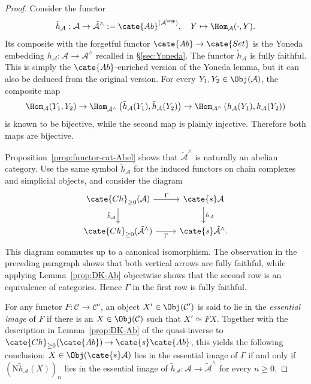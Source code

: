 \begin{proof}
	Consider the functor
	\[ \tilde{h}_{\mathcal{A}}: \mathcal{A} \to \tilde{\mathcal{A}}^\wedge := \cate{Ab}^{(\mathcal{A}^{\opp})}, \quad Y \mapsto \Hom_{\mathcal{A}}(\cdot, Y). \]
	Its composite with the forgetful functor
	$\cate{Ab}\to\cate{Set}$ is the Yoneda embedding
	$h_{\mathcal{A}}:\mathcal{A}\to\mathcal{A}^\wedge$ recalled in
	\S\ref{sec:Yoneda}. The functor $\tilde{h}_{\mathcal{A}}$ is fully
	faithful. This is simply the $\cate{Ab}$-enriched version of the Yoneda
	lemma, but it can also be deduced from the original version. For every
	$Y_1,Y_2\in\Obj(\mathcal{A})$, the composite map
	\[ \Hom_{\mathcal{A}}(Y_1, Y_2) \to \Hom_{\tilde{\mathcal{A}}^\wedge}\left(\tilde{h}_{\mathcal{A}}(Y_1), \tilde{h}_{\mathcal{A}}(Y_2) \right) \to \Hom_{\mathcal{A}^\wedge}\left( h_{\mathcal{A}}(Y_1), h_{\mathcal{A}}(Y_2)\right) \]
	is known to be bijective, while the second map is plainly injective.
	Therefore both maps are bijective.

	Proposition~\ref{prop:functor-cat-Abel} shows that
	$\tilde{\mathcal{A}}^\wedge$ is naturally an abelian category. Use the
	same symbol $\tilde{h}_{\mathcal{A}}$ for the induced functors on chain
	complexes and simplicial objects, and consider the diagram
	\begin{equation*}\begin{tikzcd}
		\cate{Ch}_{\geq 0}(\mathcal{A}) \arrow[d, "{\tilde{h}_{\mathcal{A}}}"'] \arrow[r, "\Gamma"] & \cate{s}\mathcal{A} \arrow[d, "{\tilde{h}_{\mathcal{A}}}"] \\
		\cate{Ch}_{\geq 0}(\tilde{\mathcal{A}}^\wedge) \arrow[r, "\Gamma"'] & \cate{s}\tilde{\mathcal{A}}^\wedge.
	\end{tikzcd}\end{equation*}
	This diagram commutes up to a canonical isomorphism. The observation in the
	preceding paragraph shows that both vertical arrows are fully faithful,
	while applying Lemma~\ref{prop:DK-Ab} objectwise shows that the second row
	is an equivalence of categories. Hence $\Gamma$ in the first row is fully
	faithful.

	For any functor $F:\mathcal{C}\to\mathcal{C}'$, an object
	$X'\in\Obj(\mathcal{C}')$ is said to lie in the \emph{essential image} of
	$F$ if there is an $X\in\Obj(\mathcal{C})$ such that $X'\simeq FX$.
	Together with the description in Lemma~\ref{prop:DK-Ab} of the
	quasi-inverse to
	$\cate{Ch}_{\geq0}(\cate{Ab})\to\cate{s}\cate{Ab}$, this yields the
	following conclusion: $X\in\Obj(\cate{s}\mathcal{A})$ lies in the
	essential image of $\Gamma$ if and only if
	$(\mathrm{N}\tilde{h}_{\mathcal{A}}(X))_n$ lies in the essential image of
	$\tilde{h}_{\mathcal{A}}:\mathcal{A}\to
	\tilde{\mathcal{A}}^\wedge$ for every $n\geq0$.


\end{proof}
